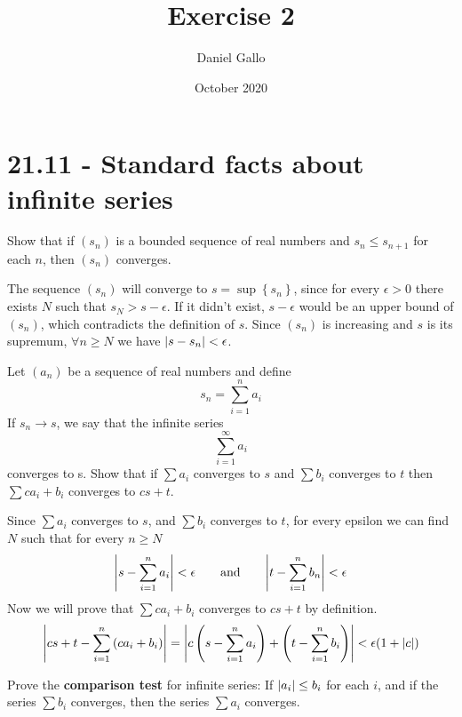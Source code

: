 \documentclass{article}
\title{Exercise 2}
\author{Daniel Gallo}
\date{October 2020}
\DeclarePairedDelimiter\abs{\lvert}{\rvert}%
\begin{document}
    \maketitle
    \section*{21.11 - Standard facts about infinite series}
    \begin{tcolorbox}[title=Exercise a]
        \label{21.11a}
        Show that if $(s_n)$ is a bounded sequence of real numbers and $s_n \leq s_{n + 1}$ for each $n$, then $(s_n)$ converges.
    \end{tcolorbox}
    \noindent
    The sequence $(s_n)$ will converge to $s = \sup\left\{s_n\right\}$, since for every $\epsilon > 0$ there exists $N$ such that $s_N > s - \epsilon$. If it didn't exist, $s - \epsilon$ would be an upper bound of $(s_n)$, which contradicts the definition of $s$. Since $(s_n)$ is increasing and $s$ is its supremum, $\forall n \geq N$ we have $\abs{s - s_n} < \epsilon$.
    \begin{tcolorbox}[title=Exercise b]
        \label{21.11b}
        Let $(a_n)$ be a sequence of real numbers and define
        \begin{equation*}
            s_n = \sum_{i=1}^n{a_i}
        \end{equation*}
        If $s_n \rightarrow s$, we say that the infinite series
        \begin{equation*}
            \sum_{i=1}^\infty{a_i}
        \end{equation*}
        converges to s. Show that if $\sum{a_i}$ converges to $s$ and $\sum{b_i}$ converges to $t$ then $\sum{ca_i + b_i}$ converges to $cs + t$.
    \end{tcolorbox}
    \noindent
    Since $\sum{a_i}$ converges to $s$, and $\sum{b_i}$ converges to $t$, for every epsilon we can find $N$ such that for every $n \geq N$
    \begin{equation*}
        \abs*{s - \sum_{i=1}^n{a_i}} < \epsilon \qquad \text{and} \qquad \abs*{t - \sum_{i=1}^n{b_n}} < \epsilon
    \end{equation*}
    Now we will prove that $\sum{ca_i + b_i}$ converges to $cs + t$ by definition.
    \begin{equation*}
        \abs*{cs+t - \sum_{i=1}^n{\left(ca_i + b_i\right)}} = \abs*{c\left(s - \sum_{i=1}^n{a_i}\right) + \left(t - \sum_{i=1}^n{b_i}\right)} < \epsilon(1 + \abs{c})
    \end{equation*}
    \begin{tcolorbox}[title=Exercise c]
        \label{21.11c}
        Prove the \textbf{comparison test} for infinite series: If $\abs{a_i} \leq b_i$ for each $i$, and if the series $\sum{b_i}$ converges, then the series $\sum{a_i}$ converges.
    \end{tcolorbox}
\end{document}
